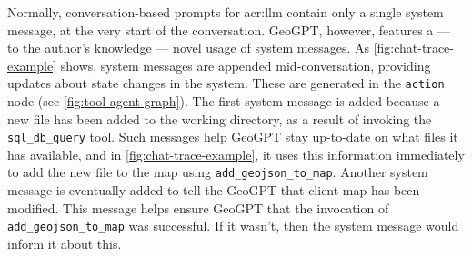 Normally, conversation-based prompts for \acrshort{acr:llm} contain only a single system message, at the very start of the conversation. GeoGPT, however, features a --- to the author's knowledge --- novel usage of system messages. As \autoref{fig:chat-trace-example} shows, system messages are appended mid-conversation, providing updates about state changes in the system. These are generated in the \texttt{action} node (see \autoref{fig:tool-agent-graph}). The first system message is added because a new file has been added to the working directory, as a result of invoking the \texttt{sql\_db\_query} tool. Such messages help GeoGPT stay up-to-date on what files it has available, and in \autoref{fig:chat-trace-example}, it uses this information immediately to add the new file to the map using \texttt{add\_geojson\_to\_map}. Another system message is eventually added to tell the GeoGPT that client map has been modified. This message helps ensure GeoGPT that the invocation of \texttt{add\_geojson\_to\_map} was successful. If it wasn't, then the system message would inform it about this.

\glsresetall


